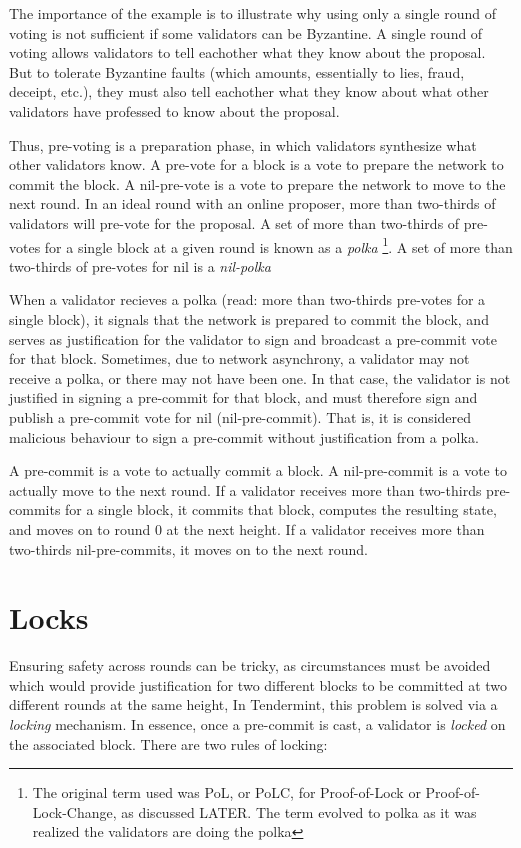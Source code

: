The importance of the example is to illustrate why using only a single round of voting
is not sufficient if some validators can be Byzantine.
A single round of voting allows validators to tell eachother what they know about the proposal.	
But to tolerate Byzantine faults (which amounts, essentially to lies, fraud, deceipt, etc.), 
they must also tell eachother what they know about what other validators have professed to know about the proposal.

Thus, pre-voting is a preparation phase, in which validators synthesize what other validators know.
A pre-vote for a block is a vote to prepare the network to commit the block.
A nil-pre-vote is a vote to prepare the network to move to the next round.
In an ideal round with an online proposer, more than two-thirds of validators will pre-vote for the proposal.
A set of more than two-thirds of pre-votes for a single block at a given round is known as a \emph{polka} \footnote{The original term used was PoL, or PoLC, for Proof-of-Lock or Proof-of-Lock-Change, as discussed LATER. The term evolved to polka as it was realized the validators are doing the polka}.
A set of more than two-thirds of pre-votes for nil is a \emph{nil-polka}

When a validator recieves a polka (read: more than two-thirds pre-votes for a single block), 
it signals that the network is prepared to commit the block,
and serves as justification for the validator to sign and broadcast a pre-commit vote for that block.
Sometimes, due to network asynchrony, a validator may not receive a polka, or there may not have been one. 
In that case, the validator is not justified in signing a pre-commit for that block, 
and must therefore sign and publish a pre-commit vote for nil (nil-pre-commit).
That is, it is considered malicious behaviour to sign a pre-commit without justification from a polka.

A pre-commit is a vote to actually commit a block.
A nil-pre-commit is a vote to actually move to the next round.
If a validator receives more than two-thirds pre-commits for a single block, 
it commits that block, computes the resulting state,
and moves on to round 0 at the next height.
If a validator receives more than two-thirds nil-pre-commits,
it moves on to the next round.

\section{Locks}

Ensuring safety across rounds can be tricky, 
as circumstances must be avoided which would provide justification for two different blocks to be committed at two different rounds at the same height, 
In Tendermint, this problem is solved via a \emph{locking} mechanism.
In essence, once a pre-commit is cast, a validator is \emph{locked} on the associated block.
There are two rules of locking:

